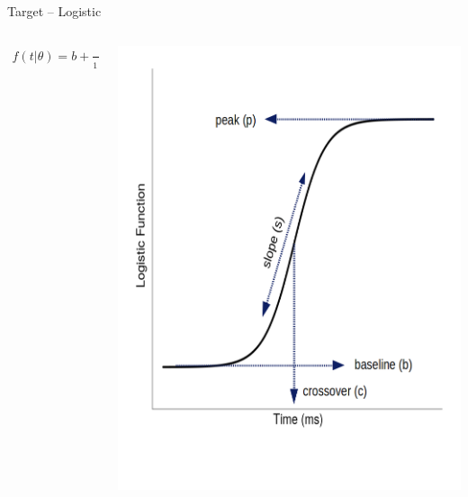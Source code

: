 \documentclass{beamer}
\begin{document}
\begin{frame}{Target -- Logistic}

\vspace{-5mm}

\begin{columns}
\begin{column}{0.45\textwidth}

\begin{align*}
f(t | \theta) = b + \frac{p-b}{1 + \exp \left( \frac{4s}{p-b} (c - t) \right)}
\end{align*}
\end{column}
\begin{column}{0.5\textwidth}  %
\begin{center}
\includegraphics[scale=0.3]{img/logistic_label.png}
\end{center}
\end{column}
\end{columns}
\end{frame}
\end{document}
